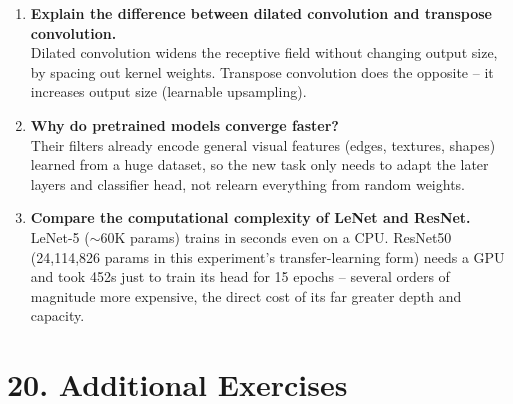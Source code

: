 \documentclass[11pt]{article}
\begin{document}
\begin{enumerate}
\item \textbf{Explain the difference between dilated convolution and transpose convolution.}\\
Dilated convolution widens the receptive field without changing
output size, by spacing out kernel weights. Transpose convolution
does the opposite -- it increases output size (learnable upsampling).

\item \textbf{Why do pretrained models converge faster?}\\
Their filters already encode general visual features (edges,
textures, shapes) learned from a huge dataset, so the new task only
needs to adapt the later layers and classifier head, not relearn
everything from random weights.

\item \textbf{Compare the computational complexity of LeNet and ResNet.}\\
LeNet-5 ($\sim$60K params) trains in seconds even on a CPU. ResNet50
(24,114,826 params in this experiment's transfer-learning form) needs
a GPU and took 452s just to train its head for 15 epochs -- several
orders of magnitude more expensive, the direct cost of its far
greater depth and capacity.

\end{enumerate}

\section*{20. Additional Exercises}
\end{document}

